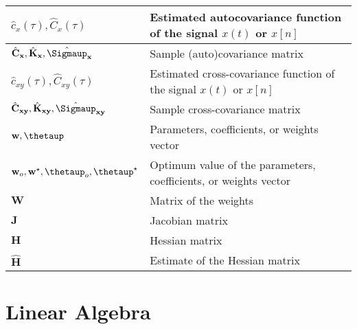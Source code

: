 \documentclass{article}
\begin{document}
\begin{xltabular}{\textwidth}{XX}
    \(\hat{c}_x(\tau), \hat{C}_x(\tau)\) & Estimated autocovariance function of the signal \(x(t)\) or \(x[n]\)\\ \hline
    \(\hat{\mathbf{C}}_\mathbf{x}, \hat{\mathbf{K}}_\mathbf{x}, \hat{\boldsymbol{\Sigmaup}}_\mathbf{x}\) & Sample (auto)covariance matrix \\ \hline
    \(\hat{c}_{xy}(\tau), \hat{C}_{xy}(\tau)\) & Estimated cross-covariance function of the signal \(x(t)\) or \(x[n]\)\\ \hline
    \(\hat{\mathbf{C}}_{\mathbf{xy}}, \hat{\mathbf{K}}_{\mathbf{xy}}, \hat{\boldsymbol{\Sigmaup}}_{\mathbf{xy}}\) & Sample cross-covariance matrix \\ \hline
    \(\mathbf{w}, \boldsymbol{\thetaup}\) & Parameters, coefficients, or weights vector \\ \hline
    \(\mathbf{w}_o, \mathbf{w}^{\star}, \boldsymbol{\thetaup}_o, \boldsymbol{\thetaup}^{\star}\) & Optimum value of the parameters, coefficients, or weights vector \\ \hline
    \(\mathbf{W}\) & Matrix of the weights \\ \hline
    \(\mathbf{J}\) & Jacobian matrix\\ \hline
    \(\mathbf{H}\) & Hessian matrix \\ \hline
    \(\hat{\mathbf{H}}\) & Estimate of the Hessian matrix
\end{xltabular}

\section{Linear Algebra}
\end{document}
